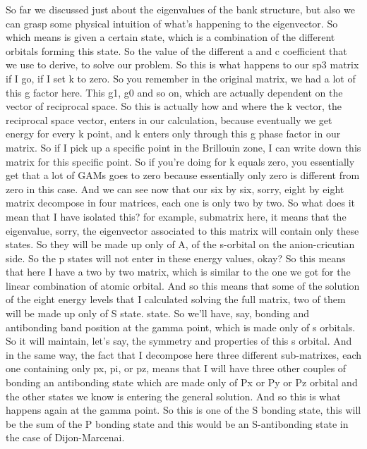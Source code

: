 So far we discussed just about the eigenvalues of the bank structure, but also we can grasp some physical intuition of what's happening to the eigenvector. So which means is given a certain state, which is a combination of the different orbitals forming this state. So the value of the different a and c coefficient that we use to derive, to solve our problem. So this is what happens to our sp3 matrix if I go, if I set k to zero. So you remember in the original matrix, we had a lot of this g factor here. This g1, g0 and so on, which are actually dependent on the vector of reciprocal space. So this is actually how and where the k vector, the reciprocal space vector, enters in our calculation, because eventually we get energy for every k point, and k enters only through this g phase factor in our matrix. So if I pick up a specific point in the Brillouin zone, I can write down this matrix for this specific point. So if you're doing for k equals zero, you essentially get that a lot of GAMs goes to zero because essentially only zero is different from zero in this case. And we can see now that our six by six, sorry, eight by eight matrix decompose in four matrices, each one is only two by two. So what does it mean that I have isolated this? for example, submatrix here, it means that the eigenvalue, sorry, the eigenvector associated to this matrix will contain only these states. So they will be made up only of A, of the s-orbital on the anion-cricutian side. So the p states will not enter in these energy values, okay? So this means that here I have a two by two matrix, which is similar to the one we got for the linear combination of atomic orbital. And so this means that some of the solution of the eight energy levels that I calculated solving the full matrix, two of them will be made up only of S state. state. So we'll have, say, bonding and antibonding band position at the gamma point, which is made only of s orbitals. So it will maintain, let's say, the symmetry and properties of this s orbital. And in the same way, the fact that I decompose here three different sub-matrixes, each one containing only px, pi, or pz, means that I will have three other couples of bonding an antibonding state which are made only of Px or Py or Pz orbital and the other states we know is entering the general solution. And so this is what happens again at the gamma point. So this is one of the S bonding state, this will be the sum of the P bonding state and this would be an S-antibonding state in the case of Dijon-Marcenai.
